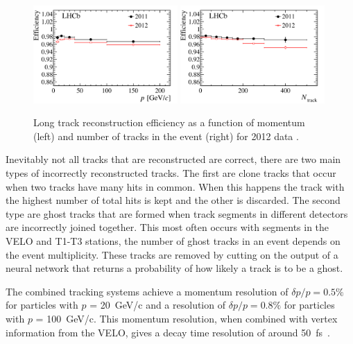 \begin{figure}[tb] 
  \centering    
  \includegraphics[width=0.49\textwidth]{./Figs/LHC_LHCb/hidef_Fig16topleft.png}
  \includegraphics[width=0.49\textwidth]{./Figs/LHC_LHCb/hidef_Fig16bottomleft.png}
  \caption{Long track reconstruction efficiency as a function of momentum (left) and number of tracks in the event (right) for 2012 data \cite{Aaij:2014pwa}.}
  \label{fig:types_of_tracks}
\end{figure}




Inevitably not all tracks that are reconstructed are correct, there are two main types of incorrectly reconstructed tracks. The first are clone tracks that occur when two tracks have many hits in common. When this happens the track with the highest number of total hits is kept and the other is discarded. The second type are ghost tracks that are formed when track segments in different detectors are incorrectly joined together. This most often occurs with segments in the VELO and T1-T3 stations, the number of ghost tracks in an event depends on the event multiplicity. These tracks are removed by cutting on the output of a neural network that returns a probability of how likely a track is to be a ghost. %



The combined tracking systems achieve a momentum resolution of $\delta p / p = 0.5\%$ for particles with $p$ =  20~GeV/c and a resolution of $\delta p / p = 0.8\%$ for particles with $p$ =  100~GeV/c.  This momentum resolution, when combined with vertex information from the VELO, gives a decay time resolution of around 50~fs~\cite{Aaij:2014jba}. 



